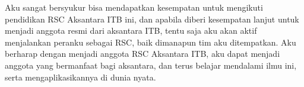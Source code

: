 \documentclass{article}
\begin{document}
Aku sangat bersyukur bisa mendapatkan kesempatan untuk mengikuti pendidikan RSC Aksantara ITB ini, dan apabila diberi kesempatan lanjut untuk menjadi anggota resmi dari aksantara ITB, tentu saja aku akan aktif menjalankan peranku sebagai RSC, baik dimanapun tim aku ditempatkan.
Aku berharap dengan menjadi anggota RSC Aksantara ITB, aku dapat menjadi anggota yang bermanfaat bagi aksantara, dan terus belajar mendalami ilmu ini, serta mengaplikasikannya di dunia nyata.
\end{document}
